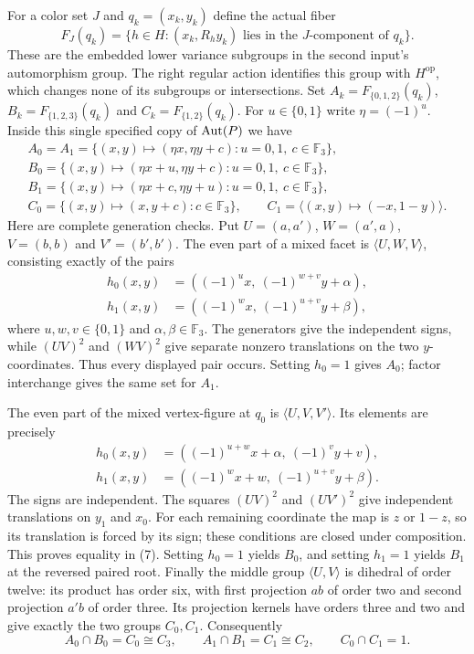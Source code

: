 \documentclass[a4paper,11pt]{article}
\newcommand{\gen}[1]{\langle#1\rangle}
\newcommand{\F}{\mathbb F_3}
\begin{document}
For a color set $J$ and $q_k=(x_k,y_k)$ define the actual fiber
\[
 F_J(q_k)=\{h\in H:(x_k,R_hy_k)\text{ lies in the }J
                  \text{-component of }q_k\}.
\]
These are the embedded lower variance subgroups in the second input's
automorphism group. The right regular action identifies this group with
$H^{\mathrm{op}}$, which changes none of its subgroups or intersections.
Set $A_k=F_{\{0,1,2\}}(q_k)$, $B_k=F_{\{1,2,3\}}(q_k)$ and
$C_k=F_{\{1,2\}}(q_k)$. For $u\in\{0,1\}$ write $\eta=(-1)^u$.
Inside this single specified copy of $\operatorname{Aut}(P)$ we have
\[
\begin{array}{ll}
 A_0=A_1=\{(x,y)\mapsto(\eta x,\eta y+c):u=0,1,\ c\in\F\},\\
 B_0=\{(x,y)\mapsto(\eta x+u,\eta y+c):u=0,1,\ c\in\F\},\\
 B_1=\{(x,y)\mapsto(\eta x+c,\eta y+u):u=0,1,\ c\in\F\},\\
 C_0=\{(x,y)\mapsto(x,y+c):c\in\F\},\qquad
 C_1=\gen{(x,y)\mapsto(-x,1-y)}.
\end{array}                                                       \tag{5}
\]
Here are complete generation checks. Put $U=(a,a')$, $W=(a',a)$,
$V=(b,b)$ and $V'=(b',b')$. The even part of a mixed facet is
$\gen{U,W,V}$, consisting exactly of the pairs
\[
\begin{split}
 h_0(x,y)&=((-1)^u x,\ (-1)^{w+v}y+\alpha),\\
 h_1(x,y)&=((-1)^w x,\ (-1)^{u+v}y+\beta),
\end{split}                                                       \tag{6}
\]
where $u,w,v\in\{0,1\}$ and $\alpha,\beta\in\F$.
The generators give the independent signs, while $(UV)^2$ and
$(WV)^2$ give separate nonzero translations on the two $y$-coordinates.
Thus every displayed pair occurs. Setting $h_0=1$ gives $A_0$;
factor interchange gives the same set for $A_1$.

The even part of the mixed vertex-figure at $q_0$ is
$\gen{U,V,V'}$. Its elements are precisely
\[
\begin{split}
 h_0(x,y)&=((-1)^{u+w}x+\alpha,\ (-1)^v y+v),\\
 h_1(x,y)&=((-1)^w x+w,\ (-1)^{u+v}y+\beta).
\end{split}                                                       \tag{7}
\]
The signs are independent. The squares $(UV)^2$ and $(UV')^2$ give
independent translations on $y_1$ and $x_0$. For each remaining
coordinate the map is $z$ or $1-z$, so its translation is forced by
its sign; these conditions are closed under composition. This proves
equality in (7). Setting $h_0=1$ yields $B_0$, and setting $h_1=1$
yields $B_1$ at the reversed paired root.
Finally the middle group $\gen{U,V}$ is dihedral of order twelve:
its product has order six, with first projection $ab$ of order two
and second projection $a'b$ of order three. Its projection kernels
have orders three and two and give exactly the two groups $C_0,C_1$.
Consequently
\[
 A_0\cap B_0=C_0\cong C_3,\qquad
 A_1\cap B_1=C_1\cong C_2,\qquad C_0\cap C_1=1.       \tag{8}
\]
\end{document}
